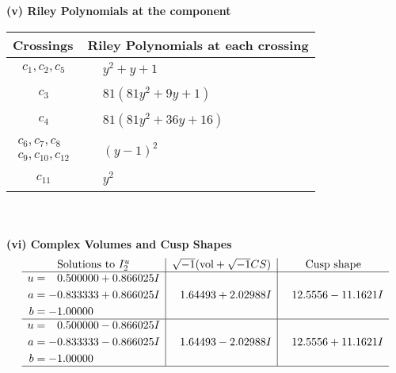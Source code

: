 \documentclass[1p]{elsarticle_modified}
\theoremstyle{definition}
\newcommand{\I}{\sqrt{-1}}
\begin{document}
\newpage\renewcommand{\arraystretch}{1}
\flushleft \textbf{(v) Riley Polynomials at the component}\newline \\
\begin{tabular}{m{50pt}|m{274pt}}
Crossings & \hspace{64pt}Riley Polynomials at each crossing \\
\hline $$\begin{aligned}c_{1},c_{2},c_{5}\end{aligned}$$&$\begin{aligned}
&y^2+y+1
\end{aligned}$\\
\hline $$\begin{aligned}c_{3}\end{aligned}$$&$\begin{aligned}
&81(81 y^2+9 y+1)
\end{aligned}$\\
\hline $$\begin{aligned}c_{4}\end{aligned}$$&$\begin{aligned}
&81(81 y^2+36 y+16)
\end{aligned}$\\
\hline $$\begin{aligned}c_{6},c_{7},c_{8}\\c_{9},c_{10},c_{12}\end{aligned}$$&$\begin{aligned}
&(y-1)^2
\end{aligned}$\\
\hline $$\begin{aligned}c_{11}\end{aligned}$$&$\begin{aligned}
&y^2
\end{aligned}$\\
\hline
\end{tabular}\\~\\
\newpage\flushleft \textbf{(vi) Complex Volumes and Cusp Shapes}
$$\begin{array}{c|c|c}  
\text{Solutions to }I^u_{2}& \I (\text{vol} + \sqrt{-1}CS) & \text{Cusp shape}\\
 \hline 
\begin{aligned}
u &= \phantom{-}0.500000 + 0.866025 I \\
a &= -0.833333 + 0.866025 I \\
b &= -1.00000\phantom{ +0.000000I}\end{aligned}
 & \phantom{-}1.64493 + 2.02988 I & \phantom{-}12.5556 - 11.1621 I \\ \hline\begin{aligned}
u &= \phantom{-}0.500000 - 0.866025 I \\
a &= -0.833333 - 0.866025 I \\
b &= -1.00000\phantom{ +0.000000I}\end{aligned}
 & \phantom{-}1.64493 - 2.02988 I & \phantom{-}12.5556 + 11.1621 I\\
 \hline 
 \end{array}$$\newpage
\end{document}
